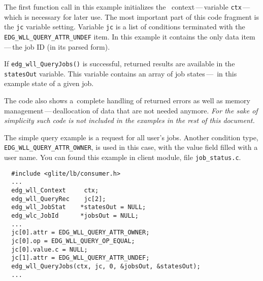 %

The first function call in this example initializes the \LB\ context\,---\,variable
\texttt{ctx}\,---\,which is necessary for later use. The most important part
of this code fragment is the \texttt{jc} variable setting.
Variable \texttt{jc} is a list of conditions terminated with the 
\texttt{EDG\_WLL\_QUERY\_ATTR\_UNDEF} item.
In this example it contains the only data item\,---\,the job ID
(in its parsed form).

If \texttt{edg\_wll\_QueryJobs()} is successful, returned results are available 
in the \texttt{statesOut} variable. This variable contains an array of job states\,---\,
in this example state of a given job.

The code also shows a~complete handling of returned errors as well as memory
management\,---\,deallocation of data that are not needed anymore.
\emph{For the sake of simplicity such code is not included in the examples
in the rest of this document.}

\label{JQ-auj}


The simple query example is a request for all user's jobs. Another
condition type, \\
\texttt{EDG\_WLL\_QUERY\_ATTR\_OWNER}, is used in this case, with the 
value field filled with a user name. You can found this example in client module, file \texttt{job\_status.c}.

\begin{verbatim}
  #include <glite/lb/consumer.h>
  ...
  edg_wll_Context     ctx;    
  edg_wll_QueryRec    jc[2];
  edg_wll_JobStat    *statesOut = NULL;
  edg_wlc_JobId      *jobsOut = NULL;
  ...
  jc[0].attr = EDG_WLL_QUERY_ATTR_OWNER;
  jc[0].op = EDG_WLL_QUERY_OP_EQUAL;
  jc[0].value.c = NULL;
  jc[1].attr = EDG_WLL_QUERY_ATTR_UNDEF;
  edg_wll_QueryJobs(ctx, jc, 0, &jobsOut, &statesOut);
  ...
\end{verbatim}

